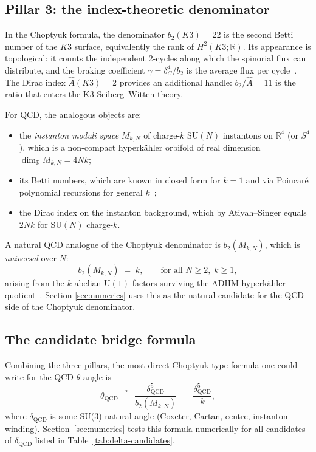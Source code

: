 \documentclass[11pt,a4paper]{article}
\newcommand{\dC}{\delta_C}
\newcommand{\SU}{\mathrm{SU}}
\theoremstyle{plain}
\theoremstyle{definition}
\theoremstyle{remark}
\begin{document}
\subsection{Pillar 3: the index-theoretic denominator}\label{ssec:pillar3}

In the Choptyuk formula, the denominator $b_2(K3) = 22$ is the second
Betti number of the $K3$ surface, equivalently the rank of
$H^2(K3;\mathbb{R})$.  Its appearance is topological: it counts the
independent $2$-cycles along which the spinorial flux can distribute,
and the braking coefficient $\gamma = \dC^4/b_2$ is the average flux
per cycle~\cite{isaev2024spinor}.  The Dirac index
$\hat A(K3) = 2$ provides an additional handle: $b_2/\hat A = 11$ is
the ratio that enters the K3 Seiberg--Witten theory.

For QCD, the analogous objects are:
\begin{itemize}[leftmargin=2em,itemsep=0.1em]
  \item the \emph{instanton moduli space} $M_{k,N}$ of charge-$k$
        $\SU(N)$ instantons on $\mathbb{R}^4$ (or $S^4$), which is a
        non-compact hyperkähler orbifold of real dimension
        $\dim_\mathbb{R} M_{k,N} = 4Nk$;
  \item its Betti numbers, which are known in closed form for $k=1$
        and via Poincaré polynomial recursions for general
        $k$~\cite{atiyahhitchin1985, donaldson1984, nakajima1994};
  \item the Dirac index on the instanton background, which by
        Atiyah--Singer equals $2Nk$ for $\SU(N)$ charge-$k$.
\end{itemize}
A natural QCD analogue of the Choptyuk denominator is $b_2(M_{k,N})$,
which is \emph{universal} over $N$:
\begin{equation}\label{eq:b2-instanton}
  b_2(M_{k,N}) \;=\; k, \qquad \text{for all } N\geq 2,\; k\geq 1,
\end{equation}
arising from the $k$ abelian $\mathrm{U}(1)$ factors surviving the
ADHM hyperkähler quotient~\cite{kronheimernakajima1990}.  Section
\ref{sec:numerics} uses this as the natural candidate for the QCD
side of the Choptyuk denominator.

\subsection{The candidate bridge formula}\label{ssec:bridge-formula}

Combining the three pillars, the most direct Choptyuk-type formula one
could write for the QCD $\theta$-angle is
\begin{equation}\label{eq:bridge-direct}
  \theta_{\mathrm{QCD}} \;\stackrel{?}{=}\;
  \frac{\delta_{\mathrm{QCD}}^5}{b_2(M_{k,N})} \;=\;
  \frac{\delta_{\mathrm{QCD}}^5}{k},
\end{equation}
where $\delta_{\mathrm{QCD}}$ is some SU(3)-natural angle (Coxeter,
Cartan, centre, instanton winding).  Section~\ref{sec:numerics} tests
this formula numerically for all candidates of $\delta_{\mathrm{QCD}}$
listed in Table~\ref{tab:delta-candidates}.
\end{document}
